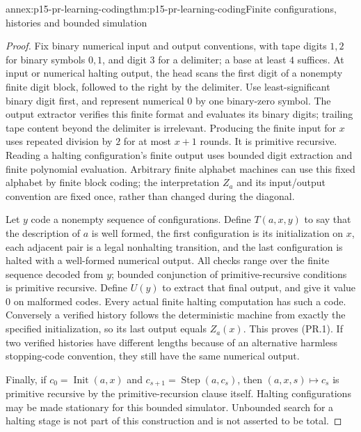 \begin{annexitem}{annex:p15-pr-learning-coding}{thm:p15-pr-learning-coding}{Finite configurations, histories and bounded simulation}
\begin{proof}
Fix binary numerical input and output conventions, with
tape digits \(1,2\) for binary symbols \(0,1\), and digit
\(3\) for a delimiter; a base at least \(4\) suffices.
At input or numerical halting output, the head scans the
first digit of a nonempty finite digit block, followed
to the right by the delimiter. Use least-significant
binary digit first, and represent numerical \(0\) by
one binary-zero symbol. The output extractor verifies
this finite format and evaluates its binary digits;
trailing tape content beyond the delimiter is irrelevant.
Producing the finite input for \(x\) uses repeated
division by \(2\) for at most \(x+1\) rounds. It is primitive recursive.
Reading a halting configuration's finite output uses bounded
digit extraction and finite polynomial evaluation.
Arbitrary finite alphabet machines can use this fixed
alphabet by finite block coding; the interpretation \(Z_a\)
and its input/output convention are fixed once, rather
than changed during the diagonal.

Let \(y\) code a nonempty sequence of configurations.
Define \(T(a,x,y)\) to say that the description of \(a\)
is well formed, the first configuration is its initialization
on \(x\), each adjacent pair is a legal nonhalting transition,
and the last configuration is halted with a well-formed
numerical output. All checks range over the finite sequence
decoded from \(y\); bounded conjunction of primitive-recursive
conditions is primitive recursive. Define \(U(y)\) to extract
that final output, and give it value \(0\) on malformed codes.
Every actual finite halting computation has such a code.
Conversely a verified history follows the deterministic
machine from exactly the specified initialization, so its
last output equals \(Z_a(x)\). This proves (PR.1).
If two verified histories have different lengths because
of an alternative harmless stopping-code convention, they
still have the same numerical output.

Finally, if \(c_0=\operatorname{Init}(a,x)\) and
\(c_{s+1}=\operatorname{Step}(a,c_s)\), then
\((a,x,s)\mapsto c_s\) is primitive recursive by the
primitive-recursion clause itself. Halting configurations
may be made stationary for this bounded simulator.
Unbounded search for a halting stage is not part of this
construction and is not asserted to be total.
\end{proof}
\end{annexitem}

